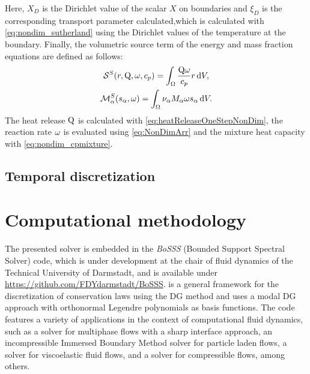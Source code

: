 Here, $X_D$ is the Dirichlet value of the scalar $X$ on boundaries and $\xi_D$ is the corresponding transport parameter calculated,which is calculated with \cref{eq:nondim_sutherland} using the Dirichlet values of the temperature at the boundary.
Finally, the volumetric source term of the energy and mass fraction equations are defined as follows:
\begin{gather}
\mathcal{S}^S(r,\mathrm{Q}, \omega,c_p) =  \int_{\Omega}{ \frac{\mathrm{Q} \omega}{c_p} r} \,\mathrm{d} V, \\
\mathcal{M}^S_\alpha(s_\alpha,\omega ) =  \int_{\Omega}{  \nu_\alpha M_\alpha \omega s_\alpha} \,\mathrm{d} V. 
\end{gather}
The heat release $\mathrm{Q}$ is calculated with \cref{eq:heatReleaseOneStepNonDim}, the reaction rate $\omega$ is evaluated using \cref{eq:NonDimArr} and the mixture heat capacity with \cref{eq:nondim_cpmixture}.
\subsection{Temporal discretization}	
\blindtext[7]

\section{Computational methodology} \label{sec:CompMethodology}

The presented solver is embedded in the \textit{BoSSS} (Bounded Support Spectral Solver) code, which is under development at the chair of fluid dynamics of the Technical University of Darmstadt, and is available under \href{https://github.com/FDYdarmstadt/BoSSS}{https://github.com/FDYdarmstadt/BoSSS}. \BoSSS is a general framework for the discretization of conservation laws using the DG method and uses a modal DG approach with orthonormal Legendre polynomials as basis functions. The \BoSSS code features a variety of applications in the context of computational fluid dynamics, such as a solver for multiphase flows with a sharp interface approach, \cite{kummerExtendedDiscontinuousGalerkin2017} an incompressible Immersed Boundary Method solver for particle laden flows,\cite{krauseIncompressibleImmersedBoundary2017} a solver for viscoelastic fluid flows,\cite{kikkerFullyCoupledHighorder} and a solver for compressible flows, \cite{geisenhoferDiscontinuousGalerkinImmersed2019} among others.

